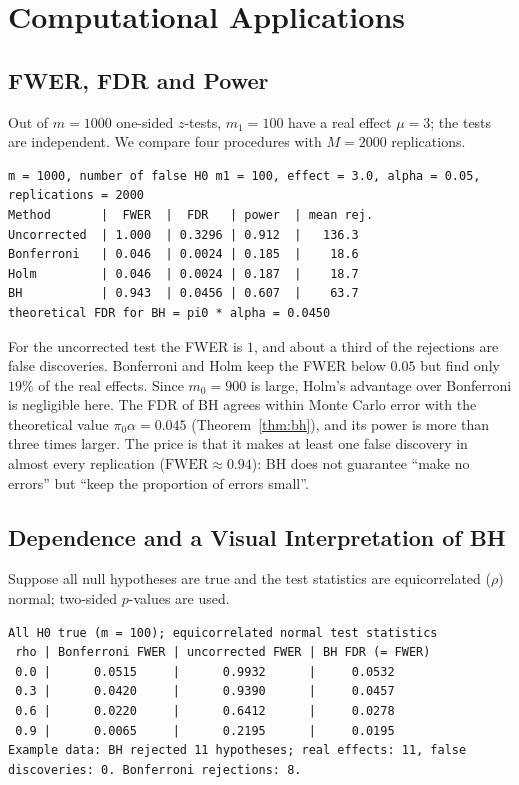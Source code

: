 \documentclass[main.tex]{subfiles}
\begin{document}
\section{Computational Applications}

\subsection{FWER, FDR and Power}
Out of $m=1000$ one-sided $z$-tests, $m_1=100$ have a real effect $\mu=3$; the tests are independent. We compare four procedures with $M=2000$ replications.

\begin{lstlisting}[style=output]
m = 1000, number of false H0 m1 = 100, effect = 3.0, alpha = 0.05, replications = 2000
Method       |  FWER  |  FDR   | power  | mean rej.
Uncorrected  | 1.000  | 0.3296 | 0.912  |   136.3
Bonferroni   | 0.046  | 0.0024 | 0.185  |    18.6
Holm         | 0.046  | 0.0024 | 0.187  |    18.7
BH           | 0.943  | 0.0456 | 0.607  |    63.7
theoretical FDR for BH = pi0 * alpha = 0.0450
\end{lstlisting}

For the uncorrected test the FWER is $1$, and about a third of the rejections are false discoveries. Bonferroni and Holm keep the FWER below $0.05$ but find only $19\%$ of the real effects. Since $m_0=900$ is large, Holm's advantage over Bonferroni is negligible here. The FDR of BH agrees within Monte Carlo error with the theoretical value $\pi_0\alpha=0.045$ (Theorem~\ref{thm:bh}), and its power is more than three times larger. The price is that it makes at least one false discovery in almost every replication ($\mathrm{FWER}\approx0.94$): BH does not guarantee ``make no errors'' but ``keep the proportion of errors small''.

\subsection{Dependence and a Visual Interpretation of BH}
Suppose all null hypotheses are true and the test statistics are equicorrelated ($\rho$) normal; two-sided $p$-values are used.

\begin{lstlisting}[style=output]
All H0 true (m = 100); equicorrelated normal test statistics
 rho | Bonferroni FWER | uncorrected FWER | BH FDR (= FWER)
 0.0 |      0.0515     |      0.9932      |     0.0532
 0.3 |      0.0420     |      0.9390      |     0.0457
 0.6 |      0.0220     |      0.6412      |     0.0278
 0.9 |      0.0065     |      0.2195      |     0.0195
Example data: BH rejected 11 hypotheses; real effects: 11, false discoveries: 0. Bonferroni rejections: 8.
\end{lstlisting}
\end{document}
